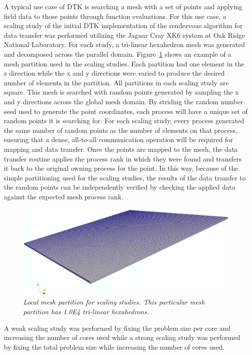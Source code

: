 \documentclass{mc2013}
\begin{document}
A typical use case of DTK is searching a mesh with a set of points and
applying field data to those points through function evaluations. For
this use case, a scaling study of the initial DTK implementation of
the rendezvous algorithm for data transfer was performed utilizing the
Jaguar Cray XK6 system at Oak Ridge National Laboratory. For each
study, a tri-linear hexahedron mesh was generated and decomposed
across the parallel domain. Figure~\ref{fig:mesh_partition} shows an
example of a mesh partition used in the scaling studies. Each
partition had one element in the z direction while the x and y
directions were varied to produce the desired number of elements in
the partition. All partitions in each scaling study are square. This
mesh is searched with random points generated by sampling the x and y
directions across the global mesh domain.  By striding the random
number seed used to generate the point coordinates, each process will
have a unique set of random points it is searching for. For each
scaling study, every process generated the same number of random
points as the number of elements on that process, ensuring that a
dense, all-to-all communication operation will be required for mapping
and data transfer. Once the points are mapped to the mesh, the data
transfer routine applies the process rank in which they were found and
transfers it back to the original owning process for the point. In
this way, because of the simple partitioning used for the scaling
studies, the results of the data transfer to the random points can be
independently verified by checking the applied data against the
expected mesh process rank.

\begin{figure}[htpb!]
  \centering \includegraphics[width=4.5in]{mesh.png}
  \caption{\sl Local mesh partition for scaling studies. This
    particular mesh partition has 1.0E4 tri-linear hexahedrons.}
  \label{fig:mesh_partition}
\end{figure}

A weak scaling study was performed by fixing the problem size per core
and increasing the number of cores used while a strong scaling study
was performed by fixing the total problem size while increasing the
number of cores used.
\end{document}
